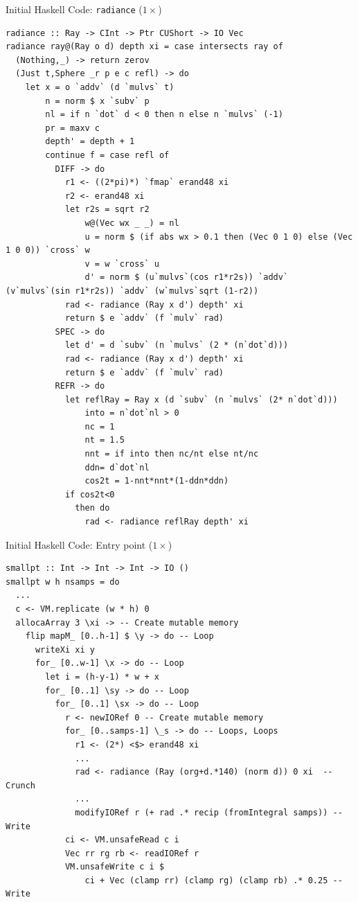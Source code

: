 \documentclass[8pt]{beamer}
\newcommand{\raw}[1]{\texttt{#1}}
\begin{document}
\begin{frame}[fragile]{Initial Haskell Code: \texttt{radiance} ($1\times$) }
\begin{verbatim}
radiance :: Ray -> CInt -> Ptr CUShort -> IO Vec
radiance ray@(Ray o d) depth xi = case intersects ray of
  (Nothing,_) -> return zerov
  (Just t,Sphere _r p e c refl) -> do
    let x = o `addv` (d `mulvs` t)
        n = norm $ x `subv` p
        nl = if n `dot` d < 0 then n else n `mulvs` (-1)
        pr = maxv c
        depth' = depth + 1
        continue f = case refl of
          DIFF -> do
            r1 <- ((2*pi)*) `fmap` erand48 xi
            r2 <- erand48 xi
            let r2s = sqrt r2
                w@(Vec wx _ _) = nl
                u = norm $ (if abs wx > 0.1 then (Vec 0 1 0) else (Vec 1 0 0)) `cross` w
                v = w `cross` u
                d' = norm $ (u`mulvs`(cos r1*r2s)) `addv` (v`mulvs`(sin r1*r2s)) `addv` (w`mulvs`sqrt (1-r2))
            rad <- radiance (Ray x d') depth' xi
            return $ e `addv` (f `mulv` rad)
          SPEC -> do
            let d' = d `subv` (n `mulvs` (2 * (n`dot`d)))
            rad <- radiance (Ray x d') depth' xi
            return $ e `addv` (f `mulv` rad)
          REFR -> do
            let reflRay = Ray x (d `subv` (n `mulvs` (2* n`dot`d)))
                into = n`dot`nl > 0                
                nc = 1
                nt = 1.5
                nnt = if into then nc/nt else nt/nc
                ddn= d`dot`nl
                cos2t = 1-nnt*nnt*(1-ddn*ddn)
            if cos2t<0
              then do
                rad <- radiance reflRay depth' xi
\end{verbatim}
\end{frame}



\begin{frame}[fragile]{Initial Haskell Code: Entry point  ($1\times$)}
\begin{verbatim}
smallpt :: Int -> Int -> Int -> IO ()
smallpt w h nsamps = do
  ...
  c <- VM.replicate (w * h) 0
  allocaArray 3 \xi -> -- Create mutable memory
    flip mapM_ [0..h-1] $ \y -> do -- Loop
      writeXi xi y
      for_ [0..w-1] \x -> do -- Loop
        let i = (h-y-1) * w + x
        for_ [0..1] \sy -> do -- Loop
          for_ [0..1] \sx -> do -- Loop
            r <- newIORef 0 -- Create mutable memory
            for_ [0..samps-1] \_s -> do -- Loops, Loops
              r1 <- (2*) <$> erand48 xi
              ...
              rad <- radiance (Ray (org+d.*140) (norm d)) 0 xi  -- Crunch
              ...
              modifyIORef r (+ rad .* recip (fromIntegral samps)) -- Write
            ci <- VM.unsafeRead c i
            Vec rr rg rb <- readIORef r
            VM.unsafeWrite c i $ 
                ci + Vec (clamp rr) (clamp rg) (clamp rb) .* 0.25 -- Write
\end{verbatim}
\end{frame}
\end{document}
